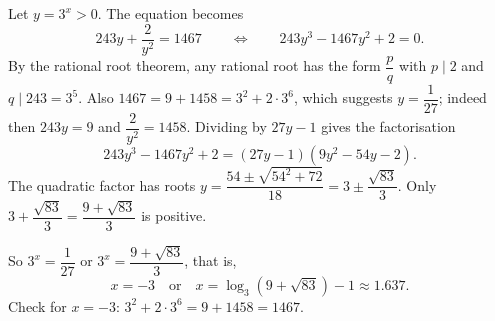 Let $y=3^x>0$. The equation becomes
\[243y+\dfrac{2}{y^2}=1467\qquad\Longleftrightarrow\qquad 243y^3-1467y^2+2=0.\]
By the rational root theorem, any rational root has the form $\dfrac{p}{q}$ with $p\mid2$ and $q\mid243=3^5$. Also $1467=9+1458=3^2+2\cdot3^6$, which suggests $y=\dfrac1{27}$; indeed then $243y=9$ and $\dfrac2{y^2}=1458$. Dividing by $27y-1$ gives the factorisation
\[243y^3-1467y^2+2=(27y-1)\left(9y^2-54y-2\right).\]
The quadratic factor has roots $y=\dfrac{54\pm\sqrt{54^2+72}}{18}=3\pm\dfrac{\sqrt{83}}{3}$. Only $3+\dfrac{\sqrt{83}}3=\dfrac{9+\sqrt{83}}{3}$ is positive.

So $3^x=\dfrac1{27}$ or $3^x=\dfrac{9+\sqrt{83}}3$, that is,
\[\boxed{x=-3\quad\text{or}\quad x=\log_3\left(9+\sqrt{83}\right)-1\approx1.637.}\]
Check for $x=-3$: $3^2+2\cdot3^6=9+1458=1467$.
